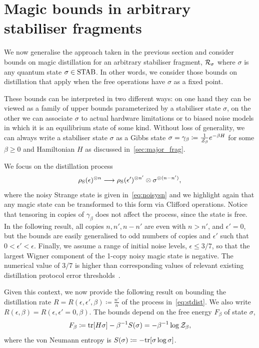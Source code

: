 \documentclass[pra,
aps,
twocolumn,
superscriptaddress,
groupedaddress,
nofootinbib,
reprint
]{revtex4-1}
\begin{document}
\section{Magic bounds in arbitrary stabiliser fragments}
\label{sec:stab}

We now generalise the approach taken in the previous section and consider bounds on magic distillation for an arbitrary stabiliser fragment, $\mathcal{R}_\sigma$ where $\sigma$ is any quantum state $\sigma \in {\rm{STAB}}$.
In other words, we consider those bounds on distillation that apply when the free operations have $\sigma$ as a fixed point.

These bounds can be interpreted in two different ways: on one hand they can be viewed as a family of upper bounds parameterized by a stabiliser state $\sigma$, on the other we can associate $\sigma$ to actual hardware limitations or to biased noise models in which it is an equilibrium state of some kind. 
Without loss of generality, we can always write a stabiliser state $\sigma$ as a Gibbs state $\sigma = \gamma_\beta \coloneqq \frac{1}{\mathcal{Z}_\beta} e^{-\beta H}$ for some $\beta \geq 0$ and Hamiltonian $H$ as discussed in~\cref{sec:major_frag}.

We focus on the distillation process
\begin{equation}\label{eq:stdist}
	\rho_{\rm{S}}(\epsilon)^{\otimes n} \longrightarrow \rho_{\rm{S}}(\epsilon')^{\otimes n'} \otimes \sigma^{\otimes (n-n')},
\end{equation}
where the noisy Strange state is given in~\cref{eq:noisysn} and we highlight again that any magic state can be transformed to this form via Clifford operations.
Notice that tensoring in copies of $\gamma_\beta$ does not affect the process, since the state is free.
In the following result, all copies $n, n', n - n'$ are even with $n > n'$, and $\epsilon'=0$, but the bounds are easily generalised to odd numbers of copies and $\epsilon'$ such that $0 < \epsilon' < \epsilon$. 
Finally, we assume a range of initial noise levels, $\epsilon \leq 3/7$, so that the largest Wigner component of the 1-copy noisy magic state is negative.
The numerical value of $3/7$ is higher than corresponding values of relevant existing distillation protocol error thresholds~\cite{cit:bravyi,cit:prakash}.

Given this context, we now provide the following result on bounding the distillation rate $R = R(\epsilon, \epsilon', \beta) \coloneqq \frac{n'}{n}$ of the process in~\cref{eq:stdist}.
We also write $R(\epsilon, \beta) = R(\epsilon, \epsilon'=0, \beta)$.
The bounds depend on the free energy $F_\beta$ of state $\sigma$,
\begin{equation}
	F_\beta \coloneqq {\rm{tr}}[H \sigma] - \beta^{-1}S(\sigma) = -\beta^{-1}\log{\mathcal{Z}_\beta},
\end{equation}
where the von Neumann entropy is $S(\sigma) \coloneqq -{\rm{tr}}[\sigma\log{\sigma}]$.
\end{document}
